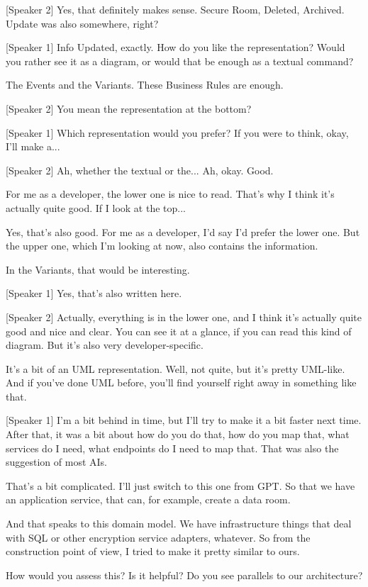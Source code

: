 [Speaker 2]
Yes, that definitely makes sense. Secure Room, Deleted, Archived. Update was also somewhere, right?

[Speaker 1]
Info Updated, exactly. How do you like the representation? Would you rather see it as a diagram, or would that be enough as a textual command?

The Events and the Variants. These Business Rules are enough.

[Speaker 2]
You mean the representation at the bottom?

[Speaker 1]
Which representation would you prefer? If you were to think, okay, I'll make a...

[Speaker 2]
Ah, whether the textual or the... Ah, okay. Good.

For me as a developer, the lower one is nice to read. That's why I think it's actually quite good. If I look at the top...

Yes, that's also good. For me as a developer, I'd say I'd prefer the lower one. But the upper one, which I'm looking at now, also contains the information.

In the Variants, that would be interesting.

[Speaker 1]
Yes, that's also written here.

[Speaker 2]
Actually, everything is in the lower one, and I think it's actually quite good and nice and clear. You can see it at a glance, if you can read this kind of diagram. But it's also very developer-specific.

It's a bit of an UML representation. Well, not quite, but it's pretty UML-like. And if you've done UML before, you'll find yourself right away in something like that.

[Speaker 1]
I'm a bit behind in time, but I'll try to make it a bit faster next time. After that, it was a bit about how do you do that, how do you map that, what services do I need, what endpoints do I need to map that. That was also the suggestion of most AIs.

That's a bit complicated. I'll just switch to this one from GPT. So that we have an application service, that can, for example, create a data room.

And that speaks to this domain model. We have infrastructure things that deal with SQL or other encryption service adapters, whatever. So from the construction point of view, I tried to make it pretty similar to ours.

How would you assess this? Is it helpful? Do you see parallels to our architecture?

